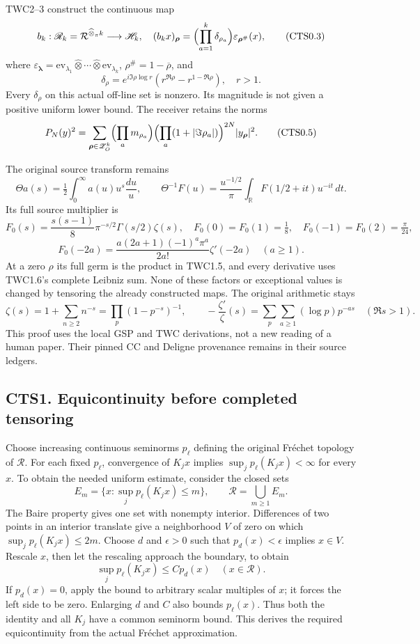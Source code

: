 TWC2--3 construct the continuous map \[
b_k:\mathscr R_k=\mathcal R^{\widehat\otimes_\pi k}\longrightarrow\mathscr H_k,
\quad
(b_kx)_{\boldsymbol\rho}=\Bigl(\prod_{a=1}^k\delta_{\rho_a}\Bigr)
\varepsilon_{\boldsymbol\rho^\#}(x),
\tag{CTS0.3}
\] where
\(\varepsilon_{\boldsymbol\lambda}=\mathrm{ev}_{\lambda_1}\widehat\otimes\cdots\widehat\otimes\mathrm{ev}_{\lambda_k}\),
\(\rho^\#=1-\overline\rho\), and \[
\delta_\rho=e^{i\Im\rho\log r}(r^{\Re\rho}-r^{1-\Re\rho}),\quad r>1.
\tag{CTS0.4}
\] Every \(\delta_\rho\) on this actual off-line set is nonzero. Its
magnitude is not given a positive uniform lower bound. The receiver
retains the norms \[
P_N(y)^2=\sum_{\boldsymbol\rho\in\mathscr Z_O^k}
\Bigl(\prod_a m_{\rho_a}\Bigr)\Bigl(\prod_a(1+|\Im\rho_a|)\Bigr)^{2N}
|y_{\boldsymbol\rho}|^2.
\tag{CTS0.5}
\]

The original source transform remains \[
\Theta a(s)=\tfrac12\int_0^\infty a(u)u^s\frac{du}{u},\qquad
\Theta^{-1}F(u)=\frac{u^{-1/2}}\pi\int_{\mathbb R}F(1/2+it)u^{-it}\,dt.
\tag{CTS0.6}
\] Its full source multiplier is \[
F_0(s)=\frac{s(s-1)}8\pi^{-s/2}\Gamma(s/2)\zeta(s),
\quad F_0(0)=F_0(1)=\tfrac18,\quad F_0(-1)=F_0(2)=\tfrac\pi{24},
\] \[
F_0(-2a)=\frac{a(2a+1)(-1)^a\pi^a}{2a!}\zeta'(-2a)\quad(a\ge1).
\tag{CTS0.7}
\] At a zero \(\rho\) its full germ is the product in TWC1.5, and every
derivative uses TWC1.6's complete Leibniz sum. None of these factors or
exceptional values is changed by tensoring the already constructed maps.
The original arithmetic stays \[
\zeta(s)=1+\sum_{n\ge2}n^{-s}=\prod_p(1-p^{-s})^{-1},\qquad
-\frac{\zeta'}\zeta(s)=\sum_p\sum_{a\ge1}(\log p)p^{-as}\quad(\Re s>1).
\tag{CTS0.8}
\] This proof uses the local GSP and TWC derivations, not a new reading
of a human paper. Their pinned CC and Deligne provenance remains in
their source ledgers.

\subsection{CTS1. Equicontinuity before completed
tensoring}\label{cts1.-equicontinuity-before-completed-tensoring}

Choose increasing continuous seminorms \(p_\ell\) defining the original
Fréchet topology of \(\mathcal R\). For each fixed \(p_\ell\),
convergence of \(K_jx\) implies \(\sup_jp_\ell(K_jx)<\infty\) for every
\(x\). To obtain the needed uniform estimate, consider the closed sets
\[
E_m=\{x:\sup_jp_\ell(K_jx)\le m\},\qquad \mathcal R=\bigcup_{m\ge1}E_m.
\] The Baire property gives one set with nonempty interior. Differences
of two points in an interior translate give a neighborhood \(V\) of zero
on which \(\sup_jp_\ell(K_jx)\le2m\). Choose \(d\) and \(\epsilon>0\)
such that \(p_d(x)<\epsilon\) implies \(x\in V\). Rescale \(x\), then
let the rescaling approach the boundary, to obtain \[
\sup_jp_\ell(K_jx)\le C p_d(x)\quad(x\in\mathcal R).
\tag{CTS1.1}
\] If \(p_d(x)=0\), apply the bound to arbitrary scalar multiples of
\(x\); it forces the left side to be zero. Enlarging \(d\) and \(C\)
also bounds \(p_\ell(x)\). Thus both the identity and all \(K_j\) have a
common seminorm bound. This derives the required equicontinuity from the
actual Fréchet approximation.

